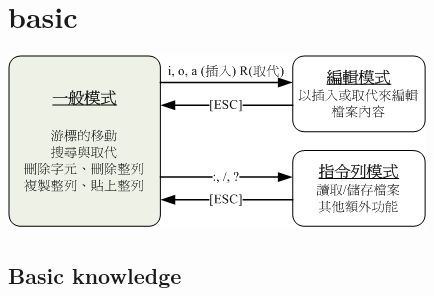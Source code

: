 \documentclass[a4paper,12pt,twoside]{book}
\begin{document}
\section{basic}

\includegraphics[scale=0.8]{pics/vi-mode} \\

\subsection{Basic knowledge}
\end{document}
